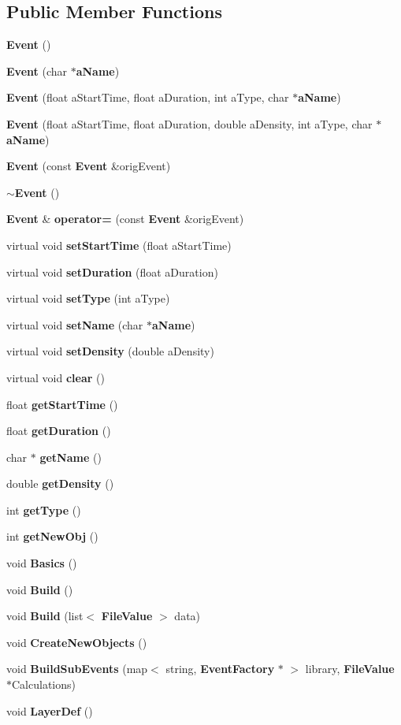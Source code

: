 \subsection*{Public Member Functions}
\begin{CompactItemize}
\item 
{\bf Event} ()
\item 
{\bf Event} (char $\ast${\bf a\-Name})
\item 
{\bf Event} (float a\-Start\-Time, float a\-Duration, int a\-Type, char $\ast${\bf a\-Name})
\item 
{\bf Event} (float a\-Start\-Time, float a\-Duration, double a\-Density, int a\-Type, char $\ast${\bf a\-Name})
\item 
{\bf Event} (const  {\bf Event} \&orig\-Event)
\item 
{\bf $\sim$Event} ()
\item 
{\bf Event} \& {\bf operator=} (const  {\bf Event} \&orig\-Event)
\item 
virtual void {\bf set\-Start\-Time} (float a\-Start\-Time)
\item 
virtual void {\bf set\-Duration} (float a\-Duration)
\item 
virtual void {\bf set\-Type} (int a\-Type)
\item 
virtual void {\bf set\-Name} (char $\ast${\bf a\-Name})
\item 
virtual void {\bf set\-Density} (double a\-Density)
\item 
virtual void {\bf clear} ()
\item 
float {\bf get\-Start\-Time} ()
\item 
float {\bf get\-Duration} ()
\item 
char $\ast$ {\bf get\-Name} ()
\item 
double {\bf get\-Density} ()
\item 
int {\bf get\-Type} ()
\item 
int {\bf get\-New\-Obj} ()
\item 
void {\bf Basics} ()
\item 
void {\bf Build} ()
\item 
void {\bf Build} (list$<$ {\bf File\-Value} $>$ data)
\item 
void {\bf Create\-New\-Objects} ()
\item 
void {\bf Build\-Sub\-Events} (map$<$ string, {\bf Event\-Factory} $\ast$ $>$ library, {\bf File\-Value} $\ast$Calculations)
\item 
void {\bf Layer\-Def} ()
\item 

\end{CompactItemize}
